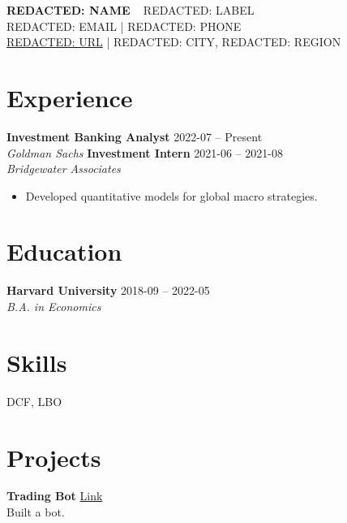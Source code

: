 \documentclass[a4paper,10pt]{article}
\begin{document}
\begin{center}
    {\Huge \textbf{REDACTED: NAME}} \
    \vspace{2mm}
    REDACTED: LABEL \\
    REDACTED: EMAIL | REDACTED: PHONE \\
    \href{REDACTED: URL}{REDACTED: URL} | REDACTED: CITY, REDACTED: REGION
\end{center}

\section*{Experience}
\noindent \textbf{Investment Banking Analyst} \hfill 2022-07 -- Present \\
\textit{Goldman Sachs}
\vspace{2mm}
\noindent \textbf{Investment Intern} \hfill 2021-06 -- 2021-08 \\
\textit{Bridgewater Associates}
\begin{itemize}[noitemsep,topsep=0pt]
        \item Developed quantitative models for global macro strategies.
    \end{itemize}
\vspace{2mm}

\section*{Education}
\noindent \textbf{Harvard University} \hfill 2018-09 -- 2022-05 \\
\textit{B.A. in Economics}
\vspace{2mm}

\section*{Skills}
\begin{description}[style=multiline,leftmargin=3cm,font=\bfseries]
        \item[Finance] DCF, LBO
        \item[EmptySkills] 
    \end{description}

\section*{Projects}
\noindent \textbf{Trading Bot} \hfill \href{https://github.com/asterling/bot}{Link} \\
Built a bot.
\vspace{2mm}
\end{document}
